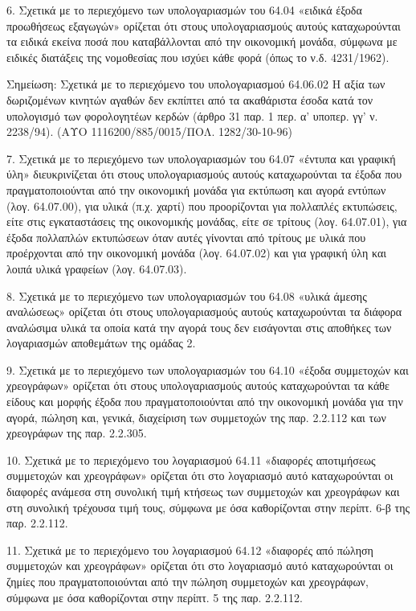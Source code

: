 \documentclass[A4,10pt,greek]{book}
\begin{document}
6. Σχετικά με το περιεχόμενο των υπολογαριασμών του 64.04 «ειδικά έξοδα προωθήσεως εξαγωγών» ορίζεται ότι στους υπολογαριασμούς αυτούς καταχωρούνται τα ειδικά εκείνα ποσά που καταβάλλονται από την οικονομική μονάδα, σύμφωνα με ειδικές διατάξεις της νομοθεσίας που ισχύει κάθε φορά (όπως το ν.δ. 4231/1962).

Σημείωση: Σχετικά με το περιεχόμενο του υπολογαριασμού 64.06.02 Η αξία των δωριζομένων κινητών αγαθών δεν εκπίπτει από τα ακαθάριστα έσοδα κατά τον υπολογισμό των φορολογητέων κερδών (άρθρο 31 παρ. 1 περ. α' υποπερ. γγ' ν. 2238/94).  (ΑΥΟ 1116200/885/0015/ΠΟΛ. 1282/30-10-96)

7. Σχετικά με το περιεχόμενο των υπολογαριασμών του 64.07 «έντυπα και γραφική ύλη» διευκρινίζεται ότι στους υπολογαριασμούς αυτούς καταχωρούνται τα έξοδα που πραγματοποιούνται από την οικονομική μονάδα για εκτύπωση και αγορά εντύπων (λογ. 64.07.00), για υλικά (π.χ. χαρτί) που προορίζονται για πολλαπλές εκτυπώσεις, είτε στις εγκαταστάσεις της οικονομικής μονάδας, είτε σε τρίτους (λογ. 64.07.01), για έξοδα πολλαπλών εκτυπώσεων όταν αυτές γίνονται από τρίτους με υλικά που προέρχονται από την οικονομική μονάδα (λογ. 64.07.02) και για γραφική ύλη και λοιπά υλικά γραφείων (λογ. 64.07.03).

8. Σχετικά με το περιεχόμενο των υπολογαριασμών του 64.08 «υλικά άμεσης αναλώσεως» ορίζεται ότι στους υπολογαριασμούς αυτούς καταχωρούνται τα διάφορα αναλώσιμα υλικά τα οποία κατά την αγορά τους δεν εισάγονται στις αποθήκες των λογαριασμών αποθεμάτων της ομάδας 2.

9. Σχετικά με το περιεχόμενο των υπολογαριασμών του 64.10 «έξοδα συμμετοχών και χρεογράφων» ορίζεται ότι στους υπολογαριασμούς αυτούς καταχωρούνται τα κάθε είδους και μορφής έξοδα που πραγματοποιούνται από την οικονομική μονάδα για την αγορά, πώληση και, γενικά, διαχείριση των συμμετοχών της παρ. 2.2.112 και των χρεογράφων της παρ. 2.2.305.

10. Σχετικά με το περιεχόμενο του λογαριασμού 64.11 «διαφορές αποτιμήσεως συμμετοχών και χρεογράφων» ορίζεται ότι στο λογαριασμό αυτό καταχωρούνται οι διαφορές ανάμεσα στη συνολική τιμή κτήσεως των συμμετοχών και χρεογράφων και στη συνολική τρέχουσα τιμή τους, σύμφωνα με όσα καθορίζονται στην περίπτ. 6-β της παρ. 2.2.112.

11. Σχετικά με το περιεχόμενο του λογαριασμού 64.12 «διαφορές από πώληση συμμετοχών και χρεογράφων» ορίζεται ότι στο λογαριασμό αυτό καταχωρούνται οι ζημίες που πραγματοποιούνται από την πώληση συμμετοχών και χρεογράφων, σύμφωνα με όσα καθορίζονται στην περίπτ. 5 της παρ. 2.2.112.
\end{document}
